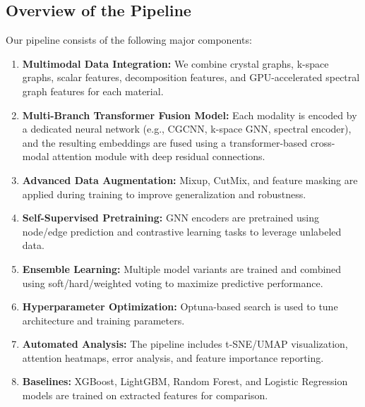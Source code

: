 \documentclass[12pt]{article}
\begin{document}
\subsection{Overview of the Pipeline}
Our pipeline consists of the following major components:
\begin{enumerate}[label=\arabic*.]
    \item \textbf{Multimodal Data Integration:} We combine crystal graphs, k-space graphs, scalar features, decomposition features, and GPU-accelerated spectral graph features for each material.
    \item \textbf{Multi-Branch Transformer Fusion Model:} Each modality is encoded by a dedicated neural network (e.g., CGCNN, k-space GNN, spectral encoder), and the resulting embeddings are fused using a transformer-based cross-modal attention module with deep residual connections.
    \item \textbf{Advanced Data Augmentation:} Mixup, CutMix, and feature masking are applied during training to improve generalization and robustness.
    \item \textbf{Self-Supervised Pretraining:} GNN encoders are pretrained using node/edge prediction and contrastive learning tasks to leverage unlabeled data.
    \item \textbf{Ensemble Learning:} Multiple model variants are trained and combined using soft/hard/weighted voting to maximize predictive performance.
    \item \textbf{Hyperparameter Optimization:} Optuna-based search is used to tune architecture and training parameters.
    \item \textbf{Automated Analysis:} The pipeline includes t-SNE/UMAP visualization, attention heatmaps, error analysis, and feature importance reporting.
    \item \textbf{Baselines:} XGBoost, LightGBM, Random Forest, and Logistic Regression models are trained on extracted features for comparison.
\end{enumerate}
\end{document}

